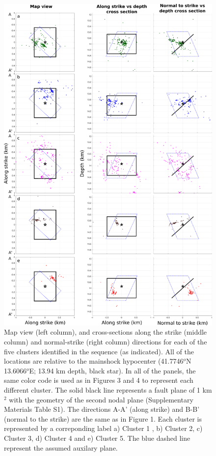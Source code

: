 \documentclass[a4paper,12pt]{article}
\begin{document}
\begin{figure}
\renewcommand{\thefigure}{S\arabic{figure}}
\begin{center}
 \noindent  \includegraphics[width=0.7\linewidth]{S3_NP1_NP2_map_cluesters} 
\end{center}
\caption{Map view (left column), and cross-sections along the strike (middle column) and normal-strike (right column) directions for each of the five clusters identified in the sequence (as indicated). All of the locations are relative to the mainshock hypocenter (41.7746$^o$N 13.6066$^o$E; 13.94 km depth, black star). In all of the panels, the same color code is used as in Figures 3 and 4 to represent each different cluster. The solid black line represents a fault plane of 1 km$^2$ with the geometry of the second nodal plane (Supplementary Materials Table S1). The directions A-A' (along strike) and B-B' (normal to the strike) are the same as in Figure 1. Each cluster is represented by a correponding label a) Cluster 1 , b) Cluster 2, c) Cluster 3, d) Cluster 4 and e) Cluster 5. The blue dashed line represent the assumed auxilary plane.}
\label{fig:map_improved_np1_np2}
\end{figure}
\end{document}
